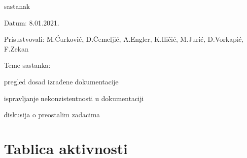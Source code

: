 \begin{packed_enum}
	
	
	\item  sastanak
	\item[] \begin{packed_item}
		\item Datum: 8.01.2021.
		\item Prisustvovali: M.Ćurković, D.Čemeljić, A.Engler, K.Iličić, M.Jurić, D.Vorkapić, F.Zekan
		\item Teme sastanka:
		\begin{packed_item}
			\item  pregled dosad izrađene dokumentacije
			\item  ispravljanje nekonzistentnosti u dokumentaciji
			\item  diskusija o preostalim zadacima
		\end{packed_item}
	\end{packed_item}
	
	
	
	
\end{packed_enum}

\eject
\section*{Tablica aktivnosti}

